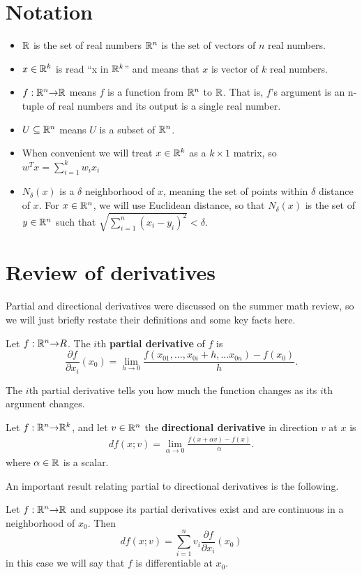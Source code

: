 \section{Notation \label{sec:notation}}
\begin{itemize}
\item $\mathbb{R}$ is the set of real numbers $\mathbb{R}^n$ is the set of
  vectors of $n$ real numbers.
\item $x \in \mathbb{R}^k$ is read ``x in $\mathbb{R}^k$'' and means that $x$ is
  vector of $k$ real numbers.
\item $f: \mathbb{R}^n {\rightarrow} \mathbb{R}$ means $f$ is a function from $\mathbb{R}^n$ to
  $\mathbb{R}$. That is, $f$'s argument is an n-tuple of real numbers and
  its output is a single real number.
\item $U \subseteq \mathbb{R}^n$ means $U$ is a subset of $\mathbb{R}^n$. 
\item When convenient we will treat $x \in \mathbb{R}^k$ as a $k \times 1$
  matrix, so $w^T x = \sum_{i=1}^k w_i x_i$
\item $N_\delta(x)$ is a $\delta$ neighborhood of $x$, meaning the set
  of points within $\delta$ distance of $x$. For $x \in \mathbb{R}^n$, we will
  use Euclidean distance, so that $N_\delta(x)$ is the set of $y \in
  \mathbb{R}^n$ such that $\sqrt{\sum_{i=1}^n (x_i - y_i)^2} < \delta$.
\end{itemize}


\section{Review of derivatives \label{sec:derivatives}}
Partial and directional derivatives were discussed on the summer math
review, so we will just briefly restate their definitions and some key
facts here.
\begin{definition}
  Let $f:\mathbb{R}^n {\rightarrow} R$. The $i$th \textbf{partial derivative} of $f$
  is
  \[ \frac{\partial f}{\partial x_i} (x_0) = \lim_{h \to 0}
  \frac{f(x_{01},...,x_{0i}+h, ... x_{0n}) - f(x_0) }{h}. \]
\end{definition}
The $i$th partial derivative tells you how much the function changes
as its $i$th argument changes. 
\begin{definition}
  Let $f: \mathbb{R}^n {\rightarrow} \mathbb{R}^k$, and let $v \in \mathbb{R}^n$ the \textbf{directional
    derivative} in direction $v$ at $x$ is
  \begin{align*}
    df(x;v) = \lim_{\alpha \to 0} \frac{f(x + \alpha v) - f(x)}{\alpha}.
  \end{align*}  
  where $\alpha \in \mathbb{R}$ is a scalar.
\end{definition}
An important result relating partial to directional derivatives is the
following.
\begin{theorem}\label{thm:pddiff}
  Let $f:\mathbb{R}^n {\rightarrow} \mathbb{R}$ and suppose its partial derivatives exist and
  are continuous in a neighborhood of $x_0$. Then
  \[ df(x;v) = \sum_{i=1}^n v_i \frac{\partial f}{\partial x_i}
  (x_0) \]
  in this case we will say that $f$ is differentiable at $x_0$.
\end{theorem}

